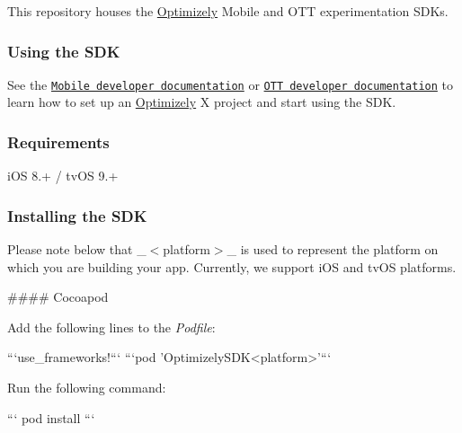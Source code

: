 \href{https://travis-ci.org/optimizely/objective-c-sdk/}{\tt } \href{http://www.apache.org/licenses/LICENSE-2.0}{\tt } \href{https://github.com/carthage/carthage}{\tt }  \href{https://cocoapods.org/pods/OptimizelySDKiOS}{\tt }  \href{https://cocoapods.org/pods/OptimizelySDKTVOS}{\tt }

This repository houses the \mbox{\hyperlink{interface_optimizely}{Optimizely}} Mobile and O\+TT experimentation S\+D\+Ks.

\subsubsection*{Using the S\+DK}

See the \href{https://developers.optimizely.com/x/solutions/sdks/reference/index.html?language=objectivec&platform=mobile}{\tt Mobile developer documentation} or \href{https://developers.optimizely.com/x/solutions/sdks/reference/index.html?language=objectivec&platform=ott}{\tt O\+TT developer documentation} to learn how to set up an \mbox{\hyperlink{interface_optimizely}{Optimizely}} X project and start using the S\+DK.

\subsubsection*{Requirements}


\begin{DoxyItemize}
\item i\+OS 8.+ / tv\+OS 9.+
\end{DoxyItemize}

\subsubsection*{Installing the S\+DK}

Please note below that \+\_\+$<$platform$>$\+\_\+ is used to represent the platform on which you are building your app. Currently, we support {\ttfamily i\+OS} and {\ttfamily tv\+OS} platforms.

\#\#\#\# Cocoapod
\begin{DoxyEnumerate}
\item Add the following lines to the {\itshape Podfile}\+:
\begin{DoxyPre}
    ```use\_frameworks!```
    ```pod 'OptimizelySDK<platform>'```
\end{DoxyPre}

\item Run the following command\+: 
\begin{DoxyPre}``` pod install ```\end{DoxyPre}

\end{DoxyEnumerate}

